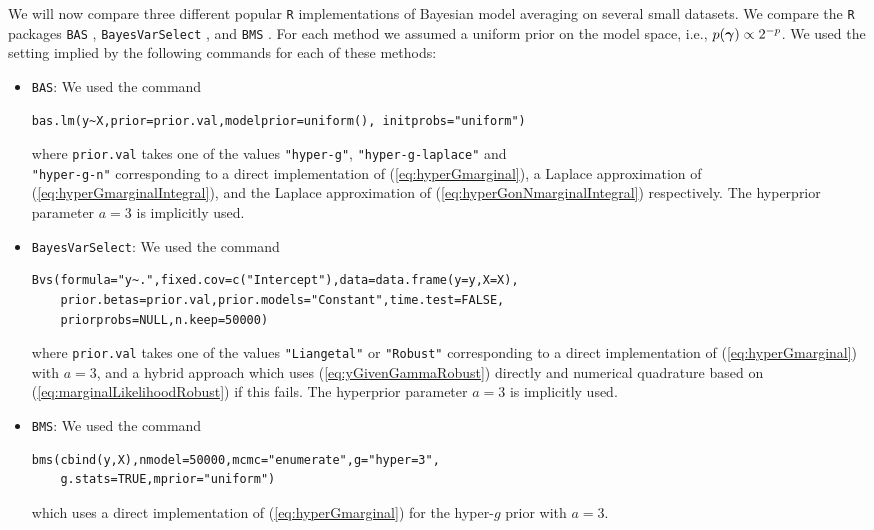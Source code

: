 We will now compare three different popular {\tt R} implementations of Bayesian model averaging on 
several small datasets. We compare the {\tt R} packages {\tt BAS} \citep{Clyde2017}, 
{\tt BayesVarSelect} \citep{Garcia-Donato2016}, and  {\tt BMS} \citep{Zeugner2015}. For each method
we assumed a uniform prior on the model space, i.e., $p({\boldsymbol \gamma})\propto 2^{-p}$. We used the
setting implied by the following commands for each of these methods:
\begin{itemize}
	\item {\tt BAS}: We used the command
\begin{verbatim}
bas.lm(y~X,prior=prior.val,modelprior=uniform(), initprobs="uniform")
\end{verbatim}

	where \verb|prior.val| takes one of the values \verb|"hyper-g"|, \verb|"hyper-g-laplace"| and\\ \verb|"hyper-g-n"| corresponding to a direct implementation of (\ref{eq:hyperGmarginal}),
	a Laplace approximation of (\ref{eq:hyperGmarginalIntegral}), and the 
	Laplace approximation of (\ref{eq:hyperGonNmarginalIntegral}) respectively. The
	hyperprior parameter $a=3$ is implicitly used.
	
	\item {\tt BayesVarSelect}: We used the command
\begin{verbatim}
Bvs(formula="y~.",fixed.cov=c("Intercept"),data=data.frame(y=y,X=X),
    prior.betas=prior.val,prior.models="Constant",time.test=FALSE,
    priorprobs=NULL,n.keep=50000)
\end{verbatim}

    
\noindent where \verb|prior.val| takes one of the values \verb|"Liangetal"| or \verb|"Robust"| 
corresponding to a direct implementation of (\ref{eq:hyperGmarginal}) with $a=3$, and a hybrid approach which
uses (\ref{eq:yGivenGammaRobust}) directly and numerical quadrature based on (\ref{eq:marginalLikelihoodRobust}) if this fails. The
hyperprior parameter $a=3$ is implicitly used.

\item {\tt BMS}: We used the command
\begin{verbatim}
bms(cbind(y,X),nmodel=50000,mcmc="enumerate",g="hyper=3",
    g.stats=TRUE,mprior="uniform")	
\end{verbatim}

\noindent which uses a direct implementation of (\ref{eq:hyperGmarginal}) for the hyper-$g$
prior with $a=3$.
\end{itemize}

